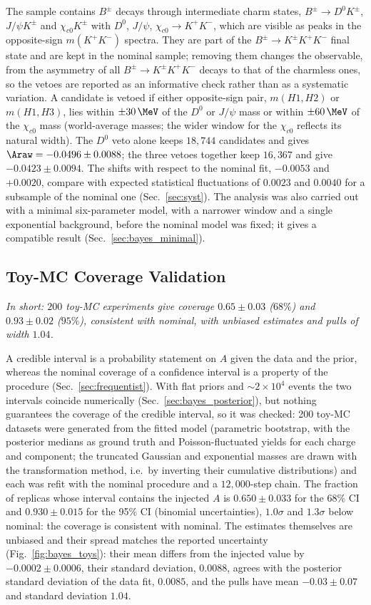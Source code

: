 The sample contains $B^\pm$ decays through intermediate charm states, $B^\pm\to D^0K^\pm$, $J/\psi K^\pm$ and $\chi_{c0}K^\pm$ with $D^0$, $J/\psi$, $\chi_{c0}\to K^+K^-$, which are visible as peaks in the opposite-sign $m(K^+K^-)$ spectra. They are part of the $B^\pm\to K^\pm K^+K^-$ final state and are kept in the nominal sample; removing them changes the observable, from the asymmetry of all $B^\pm\to K^\pm K^+K^-$ decays to that of the charmless ones, so the vetoes are reported as an informative check rather than as a systematic variation. A candidate is vetoed if either opposite-sign pair, $m(H1,H2)$ or $m(H1,H3)$, lies within $\pm30\,\MeV$ of the $D^0$ or $J/\psi$ mass or within $\pm60\,\MeV$ of the $\chi_{c0}$ mass (world-average masses; the wider window for the $\chi_{c0}$ reflects its natural width). The $D^0$ veto alone keeps $18{,}744$ candidates and gives $\Araw=-0.0496\pm0.0088$; the three vetoes together keep $16{,}367$ and give $-0.0423\pm0.0094$. The shifts with respect to the nominal fit, $-0.0053$ and $+0.0020$, compare with expected statistical fluctuations of $0.0023$ and $0.0040$ for a subsample of the nominal one (Sec.~\ref{sec:syst}). The analysis was also carried out with a minimal six-parameter model, with a narrower window and a single exponential background, before the nominal model was fixed; it gives a compatible result (Sec.~\ref{sec:bayes_minimal}).
\subsection{Toy-MC Coverage Validation}
\label{sec:bayes_toymc}
\emph{In short: $200$ toy-MC experiments give coverage $0.65\pm0.03$ ($68\%$) and $0.93\pm0.02$ ($95\%$), consistent with nominal, with unbiased estimates and pulls of width $1.04$.}

A credible interval is a probability statement on $A$ given the data and the prior, whereas the nominal coverage of a confidence interval is a property of the procedure (Sec.~\ref{sec:frequentist}). With flat priors and $\sim2\times10^4$ events the two intervals coincide numerically (Sec.~\ref{sec:bayes_posterior}), but nothing guarantees the coverage of the credible interval, so it was checked: 200 toy-MC datasets were generated from the fitted model (parametric bootstrap, with the posterior medians as ground truth and Poisson-fluctuated yields for each charge and component; the truncated Gaussian and exponential masses are drawn with the transformation method, i.e.\ by inverting their cumulative distributions) and each was refit with the nominal procedure and a $12{,}000$-step chain. The fraction of replicas whose interval contains the injected $A$ is $0.650\pm0.033$ for the 68\% CI and $0.930\pm0.015$ for the 95\% CI (binomial uncertainties), $1.0\sigma$ and $1.3\sigma$ below nominal: the coverage is consistent with nominal. The estimates themselves are unbiased and their spread matches the reported uncertainty (Fig.~\ref{fig:bayes_toys}): their mean differs from the injected value by $-0.0002\pm0.0006$, their standard deviation, $0.0088$, agrees with the posterior standard deviation of the data fit, $0.0085$, and the pulls have mean $-0.03\pm0.07$ and standard deviation $1.04$.

